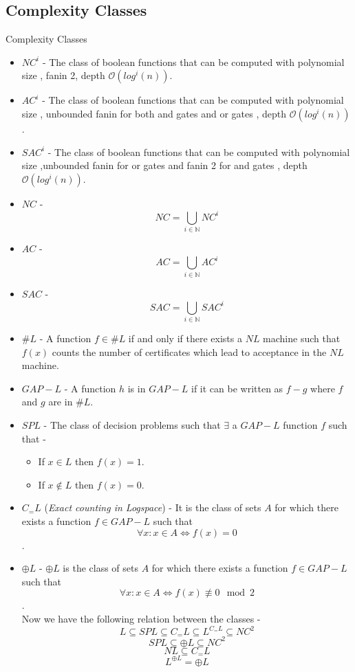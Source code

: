 \documentclass{beamer}
\begin{document}
\subsection{Complexity Classes}
\begin{frame}[allowframebreaks]{Complexity Classes}
	\begin{itemize}
		
		\item \textbf{$NC^i$} - The class of boolean functions that can be computed with polynomial size , fanin 2, depth $\mathcal{O}(log^i(n))$.
		\item  \textbf{$AC^i$} - The class of boolean functions that can be computed with polynomial size , unbounded fanin for both and gates and or gates , depth $\mathcal{O}(log^i(n))$.
		\item \textbf{$SAC^i$} - The class of boolean functions that can be computed with polynomial size ,unbounded fanin for or gates and  fanin 2 for and gates , depth $\mathcal{O}(log^i(n))$.
		\item \textbf{$NC$} - $$NC=\bigcup_{i\in \mathbb{N}} NC^i$$ 
		\item \textbf{$AC$} - $$AC=\bigcup_{i\in \mathbb{N}} AC^i$$ 
		\item \textbf{$SAC$} - $$SAC=\bigcup_{i\in \mathbb{N}} SAC^i$$ 
		\item \textbf{$\# L$} - A function $f \in \# L$ if and only if there exists a $NL $ machine such that $f(x)$ counts the number of certificates which lead to acceptance in the $NL $ machine.
		\item \textbf{$GAP-L$} - A function $h$ is in $GAP-L$ if it can be written as $f-g$ where $f$ and $g$ are in $\# L$.
 		\item \textbf{$SPL$} - The class of decision problems such that
		$\exists$ a $GAP-L$ function $f$ such that -
		\begin{itemize}
			\item If $x\in L$ then $f(x)=1$.
			\item If $x\notin L$ then $f(x)=0$.
		\end{itemize} 		
		\item \textbf{$C_{=}L$} (\textit{Exact counting in Logspace}) - It is the class of sets $A$ for which there exists a function $f\in GAP-L$ such that $$\forall x: x\in A \iff f(x)=0$$.
		\item \textbf{$\oplus L$} - $\oplus L$ is the class of sets $A$ for which there exists a function $f \in GAP-L$ such that 
		$$\forall x : x\in A \iff f(x)\not\equiv 0 \mod 2$$.
		\\
		Now we have the following relation between the classes -
		$$L \subseteq SPL \subseteq C_{=}L \subseteq L^{C_{=}L} \subseteq NC^2 $$ $$SPL \subseteq \oplus L \subseteq NC^2  $$ $$NL \subseteq C_{=}L$$ 
		$$L^{\oplus L}=\oplus L$$
	\end{itemize}
	
	
\end{frame}
\end{document}
